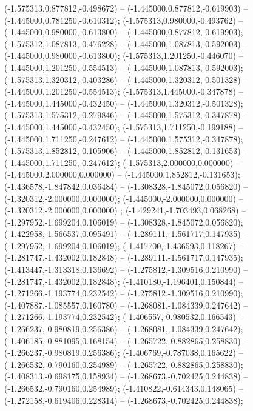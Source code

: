  (-1.575313,0.877812,-0.498672) -- (-1.445000,0.877812,-0.619903) -- (-1.445000,0.781250,-0.610312);
 (-1.575313,0.980000,-0.493762) -- (-1.445000,0.980000,-0.613800) -- (-1.445000,0.877812,-0.619903);
 (-1.575312,1.087813,-0.476228) -- (-1.445000,1.087813,-0.592003) -- (-1.445000,0.980000,-0.613800);
 (-1.575313,1.201250,-0.446070) -- (-1.445000,1.201250,-0.554513) -- (-1.445000,1.087813,-0.592003);
 (-1.575313,1.320312,-0.403286) -- (-1.445000,1.320312,-0.501328) -- (-1.445000,1.201250,-0.554513);
 (-1.575313,1.445000,-0.347878) -- (-1.445000,1.445000,-0.432450) -- (-1.445000,1.320312,-0.501328);
 (-1.575313,1.575312,-0.279846) -- (-1.445000,1.575312,-0.347878) -- (-1.445000,1.445000,-0.432450);
 (-1.575313,1.711250,-0.199188) -- (-1.445000,1.711250,-0.247612) -- (-1.445000,1.575312,-0.347878);
 (-1.575313,1.852812,-0.105906) -- (-1.445000,1.852812,-0.131653) -- (-1.445000,1.711250,-0.247612);
 (-1.575313,2.000000,0.000000) -- (-1.445000,2.000000,0.000000) -- (-1.445000,1.852812,-0.131653);
 (-1.436578,-1.847842,0.036484) -- (-1.308328,-1.845072,0.056820) -- (-1.320312,-2.000000,0.000000);
 (-1.445000,-2.000000,0.000000) -- (-1.320312,-2.000000,0.000000) ;
 (-1.429241,-1.703493,0.068268) -- (-1.297952,-1.699204,0.106019) -- (-1.308328,-1.845072,0.056820);
 (-1.422958,-1.566537,0.095491) -- (-1.289111,-1.561717,0.147935) -- (-1.297952,-1.699204,0.106019);
 (-1.417700,-1.436593,0.118267) -- (-1.281747,-1.432002,0.182848) -- (-1.289111,-1.561717,0.147935);
 (-1.413447,-1.313318,0.136692) -- (-1.275812,-1.309516,0.210990) -- (-1.281747,-1.432002,0.182848);
 (-1.410180,-1.196401,0.150844) -- (-1.271266,-1.193774,0.232542) -- (-1.275812,-1.309516,0.210990);
 (-1.407887,-1.085557,0.160780) -- (-1.268081,-1.084339,0.247642) -- (-1.271266,-1.193774,0.232542);
 (-1.406557,-0.980532,0.166543) -- (-1.266237,-0.980819,0.256386) -- (-1.268081,-1.084339,0.247642);
 (-1.406185,-0.881095,0.168154) -- (-1.265722,-0.882865,0.258830) -- (-1.266237,-0.980819,0.256386);
 (-1.406769,-0.787038,0.165622) -- (-1.266532,-0.790160,0.254989) -- (-1.265722,-0.882865,0.258830);
 (-1.408313,-0.698175,0.158934) -- (-1.268673,-0.702425,0.244838) -- (-1.266532,-0.790160,0.254989);
 (-1.410822,-0.614343,0.148065) -- (-1.272158,-0.619406,0.228314) -- (-1.268673,-0.702425,0.244838);
